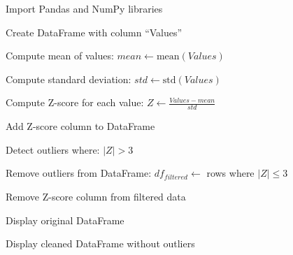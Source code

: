 \begin{algorithm}
\caption{Detect and Remove Outliers using Z-Score Method in Pandas}
\begin{algorithmic}[1]

\STATE Import Pandas and NumPy libraries

\STATE Create DataFrame with column ``Values''

\STATE Compute mean of values:
\STATE $mean \gets \text{mean}(Values)$

\STATE Compute standard deviation:
\STATE $std \gets \text{std}(Values)$

\STATE Compute Z-score for each value:
\STATE $Z \gets \frac{Values - mean}{std}$

\STATE Add Z-score column to DataFrame

\STATE Detect outliers where:
\STATE $|Z| > 3$

\STATE Remove outliers from DataFrame:
\STATE $df_{filtered} \gets$ rows where $|Z| \leq 3$

\STATE Remove Z-score column from filtered data

\STATE Display original DataFrame

\STATE Display cleaned DataFrame without outliers

\end{algorithmic}
\end{algorithm}